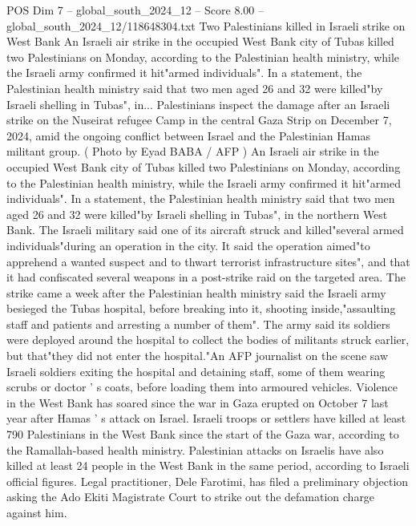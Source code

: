 \begin{textsample}{POS Dim 7 – global\_south\_2024\_12 – Score 8.00 – global\_south\_2024\_12/118648304.txt}  \label{ex:f7_pos_347}
Two Palestinians killed in Israeli strike on West Bank An Israeli air strike in the occupied West Bank city of Tubas killed two Palestinians on Monday, according to the Palestinian health ministry, while the Israeli army confirmed it hit"armed individuals".
In a statement, the Palestinian health ministry said that two men aged 26 and 32 were killed"by Israeli shelling in Tubas", in...
Palestinians inspect the damage after an Israeli strike on the Nuseirat refugee Camp in the central Gaza Strip on December 7, 2024, amid the ongoing conflict between Israel and the Palestinian Hamas militant group. ( Photo by Eyad BABA / AFP ) An Israeli air strike in the occupied West Bank city of Tubas killed two Palestinians on Monday, according to the Palestinian health ministry, while the Israeli army confirmed it hit"armed individuals".
In a statement, the Palestinian health ministry said that two men aged 26 and 32 were killed"by Israeli shelling in Tubas", in the northern West Bank.
The Israeli military said one of its aircraft struck and killed"several armed individuals"during an operation in the city.
It said the operation aimed"to apprehend a wanted suspect and to thwart terrorist infrastructure sites", and that it had confiscated several weapons in a post-strike raid on the targeted area.
The strike came a week after the Palestinian health ministry said the Israeli army besieged the Tubas hospital, before breaking into it, shooting inside,"assaulting staff and patients and arresting a number of them".
The army said its soldiers were deployed around the hospital to collect the bodies of militants struck earlier, but that"they did not enter the hospital."An AFP journalist on the scene saw Israeli soldiers exiting the hospital and detaining staff, some of them wearing scrubs or doctor ' s coats, before loading them into armoured vehicles.
Violence in the West Bank has soared since the war in Gaza erupted on October 7 last year after Hamas ' s attack on Israel.
Israeli troops or settlers have killed at least 790 Palestinians in the West Bank since the start of the Gaza war, according to the Ramallah-based health ministry.
Palestinian attacks on Israelis have also killed at least 24 people in the West Bank in the same period, according to Israeli official figures.
Legal practitioner, Dele Farotimi, has filed a preliminary objection asking the Ado Ekiti Magistrate Court to strike out the defamation charge against him.

\end{textsample}
